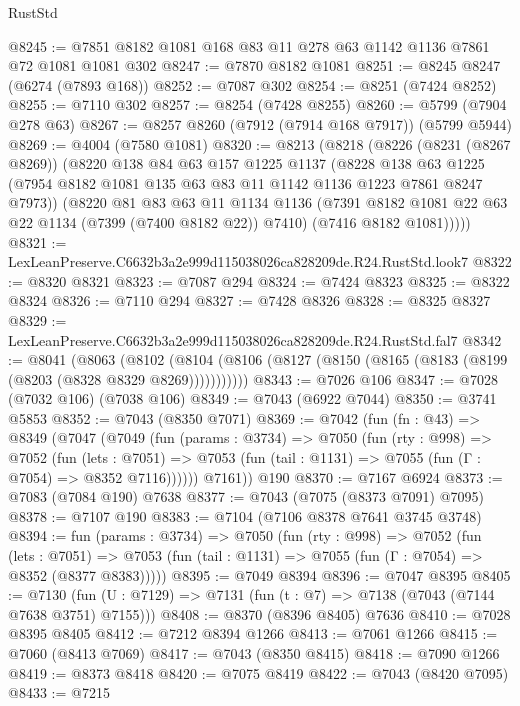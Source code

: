 \begin{lexlean}{RustStd}
\begin{coremodule}
@8245 := @7851 @8182 @1081 @168 @83 @11 @278 @63 @1142 @1136 @7861 @72 @1081 @1081 @302
@8247 := @7870 @8182 @1081
@8251 := @8245 @8247 (@6274 (@7893 @168))
@8252 := @7087 @302
@8254 := @8251 (@7424 @8252)
@8255 := @7110 @302
@8257 := @8254 (@7428 @8255)
@8260 := @5799 (@7904 @278 @63)
@8267 := @8257 @8260 (@7912 (@7914 @168 @7917)) (@5799 @5944)
@8269 := @4004 (@7580 @1081)
@8320 := @8213
    (@8218
      (@8226
        (@8231 (@8267 @8269))
        (@8220
          @138
          @84
          @63
          @157
          @1225
          @1137
          (@8228
            @138
            @63
            @1225
            (@7954 @8182 @1081 @135 @63 @83 @11 @1142 @1136 @1223 @7861 @8247 @7973))
          (@8220
            @81
            @83
            @63
            @11
            @1134
            @1136
            (@7391 @8182 @1081 @22 @63 @22 @1134 (@7399 (@7400 @8182 @22)) @7410)
            (@7416 @8182 @1081)))))
@8321 := LexLeanPreserve.C6632b3a2e999d115038026ca828209de.R24.RustStd.look7
@8322 := @8320 @8321
@8323 := @7087 @294
@8324 := @7424 @8323
@8325 := @8322 @8324
@8326 := @7110 @294
@8327 := @7428 @8326
@8328 := @8325 @8327
@8329 := LexLeanPreserve.C6632b3a2e999d115038026ca828209de.R24.RustStd.fal7
@8342 := @8041
    (@8063
      (@8102 (@8104 (@8106 (@8127 (@8150 (@8165 (@8183 (@8199 (@8203 (@8328 @8329 @8269)))))))))))
@8343 := @7026 @106
@8347 := @7028 (@7032 @106) (@7038 @106)
@8349 := @7043 (@6922 @7044)
@8350 := @3741 @5853
@8352 := @7043 (@8350 @7071)
@8369 := @7042
    (fun (fn : @43) =>
    @8349
      (@7047
        (@7049
          (fun (params : @3734) =>
          @7050
            (fun (rty : @998) =>
            @7052
              (fun (lets : @7051) =>
              @7053 (fun (tail : @1131) => @7055 (fun (Γ : @7054) => @8352 @7116))))))
        @7161))
    @190
@8370 := @7167 @6924
@8373 := @7083 (@7084 @190) @7638
@8377 := @7043 (@7075 (@8373 @7091) @7095)
@8378 := @7107 @190
@8383 := @7104 (@7106 @8378 @7641 @3745 @3748)
@8394 := fun (params : @3734) =>
  @7050
    (fun (rty : @998) =>
    @7052
      (fun (lets : @7051) =>
      @7053 (fun (tail : @1131) => @7055 (fun (Γ : @7054) => @8352 (@8377 @8383)))))
@8395 := @7049 @8394
@8396 := @7047 @8395
@8405 := @7130 (fun (U : @7129) => @7131 (fun (t : @7) => @7138 (@7043 (@7144 @7638 @3751) @7155)))
@8408 := @8370 (@8396 @8405) @7636
@8410 := @7028 @8395 @8405
@8412 := @7212 @8394 @1266
@8413 := @7061 @1266
@8415 := @7060 (@8413 @7069)
@8417 := @7043 (@8350 @8415)
@8418 := @7090 @1266
@8419 := @8373 @8418
@8420 := @7075 @8419
@8422 := @7043 (@8420 @7095)
@8433 := @7215

\end{coremodule}
\end{lexlean}

